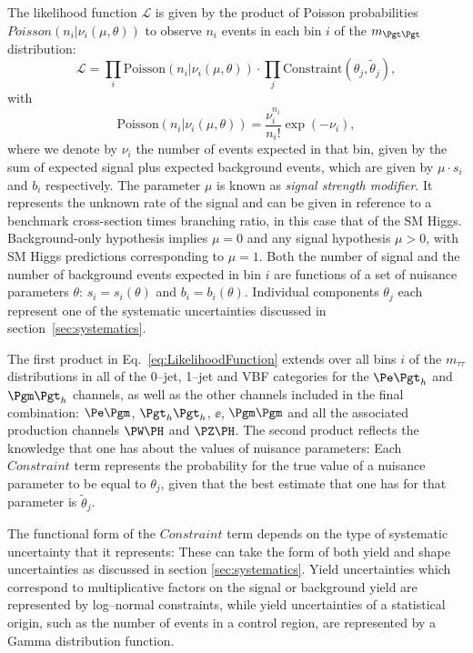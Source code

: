 The likelihood function $\mathcal{L}$ is given by the product of Poisson probabilities 
$Poisson(n_{i} \vert \nu_{i}(\mu, \theta))$ to observe $n_{i}$ events in each bin
$i$ of the $m_{\Pgt\Pgt}$ distribution:
\begin{equation}
\mathcal{L} = \prod_{i} \mathrm{Poisson}(n_{i} \vert \nu_{i}(\mu, \theta)) \cdot
\prod_{j} \mathrm{Constraint}(\theta_{j}, \tilde{\theta}_{j}),
\label{eq:LikelihoodFunction}
\end{equation}
with
\begin{equation}
\mathrm{Poisson} ( n_{i} \vert \nu_{i}(\mu, \theta )) = \frac{\nu_{i}^{n_{i}}}{n_{i}!} \exp ( -\nu_{i} ),
\label{eq:PoissonDistribution}
\end{equation}
where we denote by $\nu_{i}$ the number of events expected in that bin,
given by the sum of expected signal plus expected background events,
which are given by $\mu \cdot s_{i}$ and $b_{i}$ respectively.
The parameter $\mu$ is known as \emph{signal strength modifier}. 
It represents the unknown rate of the signal and can be given in reference to a
benchmark cross-section times branching ratio, in this case that of the \ac{SM}
Higgs. Background-only hypothesis implies $\mu = 0$ and any signal hypothesis $
\mu > 0$, with \ac{SM} Higgs predictions corresponding to $\mu = 1$.
Both the number of signal and the number of background events expected in bin $i$ 
are functions of a set of nuisance parameters $\theta$:
$s_{i} = s_{i} ( \theta )$ and $b_{i} = b_{i} ( \theta )$.
Individual components $\theta_{j}$ each represent one of the systematic uncertainties
discussed in section~\ref{sec:systematics}.

The first product in Eq.~\ref{eq:LikelihoodFunction} extends over all bins $i$
of the $m_{\tau\tau}$ distributions in all of the 0--jet, 1--jet and VBF categories 
for the $\etau$ and $\mutau$ channels, as well as the other channels included in
the final combination: $\emu$, $\tautau$, $\ee$, $\mumu$ and all the
associated production channels $\PW\PH$ and $\PZ\PH$. 
The second product reflects the knowledge that one has about the values of nuisance parameters:
Each $Constraint$ term represents the probability for the true value of a nuisance parameter to be equal to $\theta_{j}$,
given that the best estimate that one has for that parameter is
$\tilde{\theta}_{j}$.

The functional form of the $Constraint$ term depends on the type of systematic uncertainty that it represents:
These can take the form of both yield and shape uncertainties as discussed in
section \ref{sec:systematics}. Yield uncertainties which correspond
to multiplicative factors on the signal or background yield are represented by
log--normal constraints, while yield uncertainties of a statistical origin,
such as the number of events in a control region, are represented by a Gamma
distribution function. 

